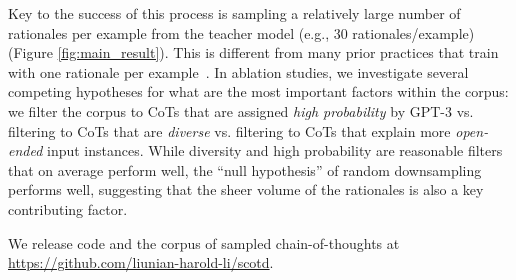 \documentclass[11pt]{article}
\newcommand\jack[1]{{\color{orange}[#1]$_{Jack}$}}
\newcommand\yj[1]{{\color{olive}[#1]$_{YJ}$}}
\newcommand\harold[1]{{\color{gray}[#1]$_{harold}$}}
\begin{document}
Key to the success of this process is sampling a relatively large number of rationales per example from the teacher model (e.g., 30 rationales/example) (Figure \ref{fig:main_result}). This is different from many prior practices that train with one rationale per example~\cite{camburu2018snli,li2022explanations}. %
In ablation studies, we investigate several competing hypotheses for what are the most important factors within the corpus: we filter the corpus to CoTs that are assigned \textit{high probability} by GPT-3 %
vs. filtering to CoTs that are \textit{diverse} vs. filtering to CoTs that explain more \textit{open-ended} input instances. While diversity and high probability are reasonable filters that on average perform well, the ``null hypothesis'' of random downsampling performs well, suggesting that the sheer volume of the rationales is also a key contributing factor.

We release code and the corpus of sampled chain-of-thoughts at \url{https://github.com/liunian-harold-li/scotd}.





\end{document}

